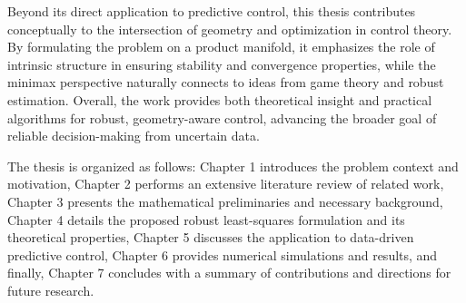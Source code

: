 {        Beyond its direct application to predictive control, this thesis contributes conceptually to the intersection of geometry and optimization in control theory. By formulating the problem on a product manifold, it emphasizes the role of intrinsic structure in ensuring stability and convergence properties, while the minimax perspective naturally connects to ideas from game theory and robust estimation. Overall, the work provides both theoretical insight and practical algorithms for robust, geometry-aware control, advancing the broader goal of reliable decision-making from uncertain data.

        The thesis is organized as follows: Chapter 1 introduces the problem context and motivation, Chapter 2 performs an extensive literature review of related work, Chapter 3 presents the mathematical preliminaries and necessary background, Chapter 4 details the proposed robust least-squares formulation and its theoretical properties, Chapter 5 discusses the application to data-driven predictive control, Chapter 6 provides numerical simulations and results, and finally, Chapter 7 concludes with a summary of contributions and directions for future research.
}

\newcommand*{\Subject}{%
    Robust Least-Squares Optimization for Data-Driven Predictive Control
}

\newcommand*{\Keywords}{%
    \textcolor{red}{Least-Squares, Data-Driven, Predictive Control, Robust Optimization}
}
\newcommand*{\KeywordsPlaintext}{%
    Least-Squares, Data-Driven, Predictive Control, Robust Optimization
}
